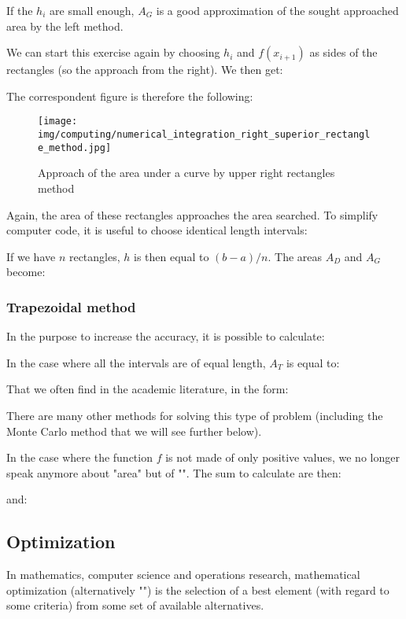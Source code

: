 	If the $h_i$ are small enough, $A_G$ is a good approximation of the sought approached area by the left method.

	We can start this exercise again by choosing $h_i$ and $f(x_{i+1})$ as sides of the rectangles (so the approach from the right). We then get:
	
	The correspondent figure is therefore the following:
	\begin{figure}[H]
		\centering
		\texttt{[image: img/computing/numerical\_integration\_right\_superior\_rectangle\_method.jpg]}
		\caption{Approach of the area under a curve by upper right rectangles method}
	\end{figure}
	Again, the area of these rectangles approaches the area searched. To simplify computer code, it is useful to choose identical length intervals:
	
	If we have $n$ rectangles, $h$ is then equal to $(b-a)/n$. The areas $A_D$ and $A_G$ become:
	
		
	
	\subsubsection{Trapezoidal method}\label{trapezoidal numerical integration}
	In the purpose to increase the accuracy, it is possible to calculate:
	
	In the case where all the intervals are of equal length, $A_T$ is equal to:
	
	That we often find in the academic literature, in the form:
	
	There are many other methods for solving this type of problem (including the Monte Carlo method that we will see further below).
	
	In the case where the function $f$ is not made of only positive values, we no longer speak anymore about "area" but of "". The sum to calculate are then:
	
	and:
	
	
	\pagebreak
	\subsection{Optimization}\label{operational research}
	In mathematics, computer science and operations research, mathematical optimization (alternatively "") is the selection of a best element (with regard to some criteria) from some set of available alternatives.
	
